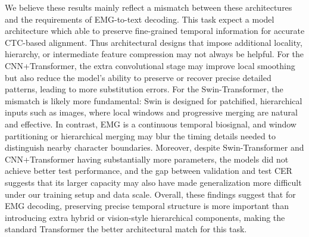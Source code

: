 \documentclass{article}
\begin{document}
We believe these results mainly reflect a mismatch between these architectures and the requirements of EMG-to-text decoding. This task expect a model architecture which able to preserve fine-grained temporal information for accurate CTC-based alignment. Thus architectural designs that impose additional locality, hierarchy, or intermediate feature compression may not always be helpful. For the CNN+Transformer, the extra convolutional stage may improve local smoothing but also reduce the model’s ability to preserve or recover precise detailed patterns, leading to more substitution errors. For the Swin-Transformer, the mismatch is likely more fundamental: Swin is designed for patchified, hierarchical inputs such as images, where local windows and progressive merging are natural and effective. In contrast, EMG is a continuous temporal biosignal, and window partitioning or hierarchical merging may blur the timing details needed to distinguish nearby character boundaries. Moreover, despite Swin-Transformer and CNN+Transformer having substantially more parameters, the models did not achieve better test performance, and the gap between validation and test CER suggests that its larger capacity may also have made generalization more difficult under our training setup and data scale. Overall, these findings suggest that for EMG decoding, preserving precise temporal structure is more important than introducing extra hybrid or vision-style hierarchical components, making the standard Transformer the better architectural match for this task.




\end{document}

